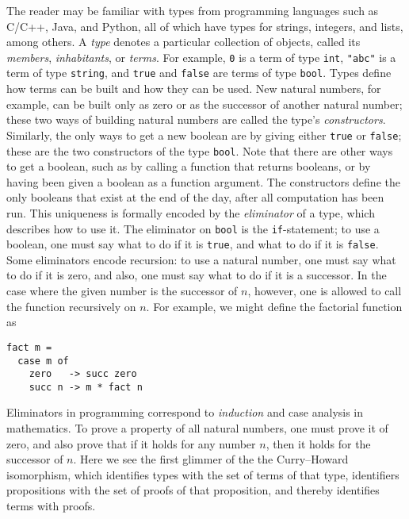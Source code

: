 The reader may be familiar with types from programming languages such as C/C++, Java, and Python, all of which have types for strings, integers, and lists, among others.
A \emph{type} denotes a particular collection of objects, called its \emph{members}, \emph{inhabitants}, or \emph{terms}.
For example, \texttt{0} is a term of type \texttt{int}, \verb|"abc"| is a term of type \texttt{string}, and \texttt{true} and \texttt{false} are terms of type \texttt{bool}.
Types define how terms can be built and how they can be used.
New natural numbers, for example, can be built only as zero or as the successor of another natural number; these two ways of building natural numbers are called the type's \emph{constructors}.
Similarly, the only ways to get a new boolean are by giving either \texttt{true} or \texttt{false}; these are the two constructors of the type \texttt{bool}.
Note that there are other ways to get a boolean, such as by calling a function that returns booleans, or by having been given a boolean as a function argument.
The constructors define the only booleans that exist at the end of the day, after all computation has been run.
This uniqueness is formally encoded by the \emph{eliminator} of a type, which describes how to use it.
The eliminator on \texttt{bool} is the \texttt{if}-statement; to use a boolean, one must say what to do if it is \texttt{true}, and what to do if it is \texttt{false}.
Some eliminators encode recursion: to use a natural number, one must say what to do if it is zero, and also, one must say what to do if it is a successor.
In the case where the given number is the successor of $n$, however, one is allowed to call the function recursively on $n$.
For example, we might define the factorial function as
\begin{verbatim}
fact m =
  case m of
    zero   -> succ zero
    succ n -> m * fact n
\end{verbatim}

Eliminators in programming correspond to \emph{induction} and case analysis in mathematics.
To prove a property of all natural numbers, one must prove it of zero, and also prove that if it holds for any number $n$, then it holds for the successor of $n$.
Here we see the first glimmer of the the Curry--Howard isomorphism, which identifies types with the set of terms of that type, identifiers propositions with the set of proofs of that proposition, and thereby identifies terms with proofs.

